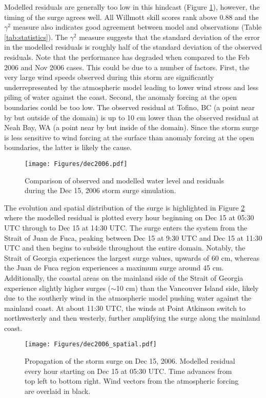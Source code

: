 \documentclass{tATO2e}
\begin{document}
Modelled residuals are generally too low in this hindcast (Figure \ref{fig:dec2006}), however, the timing of the surge agrees well. All Willmott skill scores rank above 0.88 and the $\gamma^2$ measure also indicates good agreement between model and observations (Table \ref{tab:statistics}). The $\gamma^2$ measure suggests that the standard deviation of the error in the modelled residuals is roughly half of the standard deviation of the observed residuals. Note that the performance has degraded when compared to the Feb 2006 and Nov 2006 cases. This could be due to a number of factors. First, the very large wind speeds observed during this storm are significantly underrepresented by the atmospheric model leading to lower wind stress and less piling of water against the coast. Second, the anomaly forcing at the open boundaries could be too low. The observed residual at Tofino, BC (a point near by but outside of the domain) is up to 10 cm lower than the observed residual at Neah Bay, WA (a point near by but inside of the domain). Since the storm surge is less sensitive to wind forcing at the surface than anomaly forcing at the open boundaries, the latter is likely the cause. 

\begin{figure}
\centering
\texttt{[image: Figures/dec2006.pdf]}
\caption{Comparison of observed and modelled water level and residuals during the Dec 15, 2006 storm surge simulation. }
\label{fig:dec2006}
\end{figure}

The evolution and spatial distribution of the surge is highlighted in Figure \ref{fig:spatial} where the modelled residual is plotted every hour beginning on Dec 15 at 05:30 UTC through to Dec 15 at 14:30 UTC. The surge enters the system from the Strait of Juan de Fuca, peaking between Dec 15 at 9:30 UTC and Dec 15 at 11:30 UTC and then begins to subside throughout the entire domain. Notably, the Strait of Georgia experiences the largest surge values, upwards of 60 cm, whereas the Juan de Fuca region experiences a maximum surge around 45 cm. Additionally, the coastal areas on the mainland side of the Strait of Georgia experience slightly higher surges ($\sim$10 cm) than the Vancouver Island side, likely due to the southerly wind in the atmospheric model pushing water against the mainland coast. At about 11:30 UTC, the winds at Point Atkinson switch to northwesterly and then westerly, further amplifying the surge along the mainland coast. 

\begin{figure}
\centering
\texttt{[image: Figures/dec2006\_spatial.pdf]}
\caption{Propagation of the storm surge on Dec 15, 2006. Modelled residual every hour starting on Dec 15 at 05:30 UTC. Time advances from top left to bottom right. Wind vectors from the atmospheric forcing are overlaid in black.}
\label{fig:spatial}
\end{figure}
\end{document}
